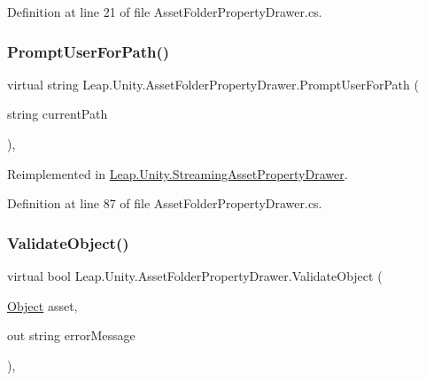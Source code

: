 Definition at line 21 of file Asset\+Folder\+Property\+Drawer.\+cs.

\mbox{\label{class_leap_1_1_unity_1_1_asset_folder_property_drawer_adf5a06cc37ba9285efd63ac70c08c5d0}} 
\subsubsection{\texorpdfstring{PromptUserForPath()}{PromptUserForPath()}}
{\footnotesize\ttfamily virtual string Leap.\+Unity.\+Asset\+Folder\+Property\+Drawer.\+Prompt\+User\+For\+Path (\begin{DoxyParamCaption}\item[{string}]{current\+Path }\end{DoxyParamCaption})\hspace{0.3cm}{\ttfamily [protected]}, {\ttfamily [virtual]}}



Reimplemented in \mbox{\hyperlink{class_leap_1_1_unity_1_1_streaming_asset_property_drawer_a47389f0e29b9aae610112e71a900b3c1}{Leap.\+Unity.\+Streaming\+Asset\+Property\+Drawer}}.



Definition at line 87 of file Asset\+Folder\+Property\+Drawer.\+cs.

\mbox{\label{class_leap_1_1_unity_1_1_asset_folder_property_drawer_a12d6bf97d917cba11f0036ff110530f2}} 
\subsubsection{\texorpdfstring{ValidateObject()}{ValidateObject()}}
{\footnotesize\ttfamily virtual bool Leap.\+Unity.\+Asset\+Folder\+Property\+Drawer.\+Validate\+Object (\begin{DoxyParamCaption}\item[{\mbox{\hyperlink{_t_m_pro___font_asset_creator_window_8cs_aef19bab18b9814edeef255c43e4f6bbc}{Object}}}]{asset,  }\item[{out string}]{error\+Message }\end{DoxyParamCaption})\hspace{0.3cm}{\ttfamily [protected]}, {\ttfamily [virtual]}}



